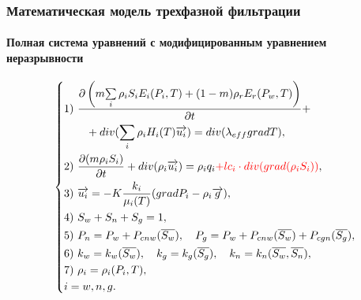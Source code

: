\begin{frame}
\begin{center}
\frametitle{Математическая модель трехфазной фильтрации}
\framesubtitle{Полная система уравнений с модифицированным уравнением неразрывности}
\begin{equation*}
\left\{
  \begin{aligned}
    & \text{1)}\ \frac{\partial \left(m {\sum\limits_{i}{\rho_i S_i E_i(P_i, T)}} + (1-m){\rho_r E_r(P_w, T)}\right)}{\partial t} + \\
    & \qquad + div(\sum_{i}{\rho_i H_i(T) \overrightarrow{u_i}}) = div(\lambda_{eff} grad T),\\
    & \text{2)}\ \frac{\partial (m \rho_i S_i)}{\partial t}+ div(\rho_i \overrightarrow{u_i}) = \rho_i q_i\textcolor{red}{ + l c_i \cdot div(grad(\rho_i S_i))}, \\
    & \text{3)}\ \overrightarrow{u_i}=-K \frac{k_i}{{\mu_i(T)}}(grad P_i - {\rho}_i\overrightarrow{g}),\\
    & \text{4)}\ S_w + S_n + S_g=1,\\
    & \text{5)}\ P_n=P_w+P_{cnw}(\overline{S_w}),\quad P_g=P_w+P_{cnw}(\overline{S_w})+P_{cgn}(\overline{S_g}),\\
    & \text{6)}\ k_w=k_w(\overline{S_w}),\quad k_g=k_g(\overline{S_g}),\quad k_n=k_n(\overline{S_w},\overline{S_n}),\\
    & \text{7)}\ \rho_i=\rho_i(P_i,T),\\
    &i=w,n,g. \\
  \end{aligned}
\right.
\end{equation*}
\end{center}
\end{frame}